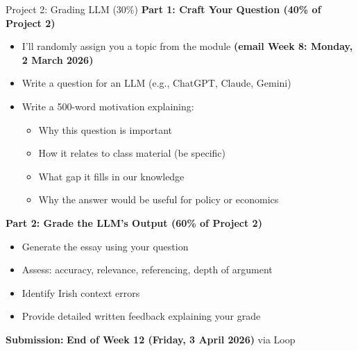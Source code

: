 \documentclass[10pt]{beamer}
\begin{document}
\begin{frame}{Project 2: Grading LLM (30\%)}
\textbf{Part 1: Craft Your Question (40\% of Project 2)}
\begin{itemize}
\item I'll randomly assign you a topic from the module \textbf{(email Week 8: Monday, 2 March 2026)}
\item Write a question for an LLM (e.g., ChatGPT, Claude, Gemini)
\item Write a 500-word motivation explaining:
\begin{itemize}
\item Why this question is important
\item How it relates to class material (be specific)
\item What gap it fills in our knowledge
\item Why the answer would be useful for policy or economics
\end{itemize}
\end{itemize}

\textbf{Part 2: Grade the LLM's Output (60\% of Project 2)}
\begin{itemize}
\item Generate the essay using your question
\item Assess: accuracy, relevance, referencing, depth of argument
\item Identify Irish context errors
\item Provide detailed written feedback explaining your grade
\end{itemize}

\textbf{Submission:} \textbf{End of Week 12 (Friday, 3 April 2026)} via Loop
\end{frame}
\end{document}
